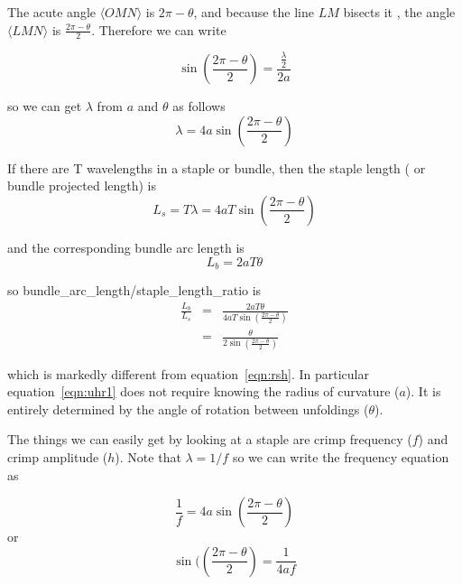 \documentclass[titlepage,10pt]{article}  %
\begin{document}


The acute angle $\langle OMN \rangle$  is $2 \pi - \theta$, and because the line $LM$ bisects it , the angle $\langle LMN \rangle$  is $\frac{2 \pi - \theta}{2}$. Therefore we can write

\begin{displaymath}
\sin\left(\frac{2 \pi - \theta}{2}\right) = \frac{\frac{\lambda}{2}}{2a}
\end{displaymath}

so we can get $\lambda$ from $a$ and $\theta$ as follows
\begin{displaymath}
\lambda = 4 a \sin\left(\frac{2 \pi - \theta}{2}\right) 
\end{displaymath}

If there are T wavelengths in a staple or bundle, then the staple length ( or bundle projected length) is 
\begin{displaymath}
L_{s} = T \lambda = 4aT \sin\left(\frac{2 \pi - \theta}{2}\right) 
\end{displaymath}

and the corresponding bundle arc length is 
\begin{displaymath}
L_{b} = 2 a T \theta
\end{displaymath}


so bundle\_arc\_length/staple\_length\_ratio  is
\begin{eqnarray}
\label{eqn:uhr1}
\frac{L_{b}}{L_{s}} & = & \frac{2 a T \theta}{4aT \sin\left(\frac{2 \pi - \theta}{2}\right)}  \nonumber \\
                    & = & \frac{\theta}{2 \sin\left(\frac{2 \pi - \theta}{2}\right)}
\end{eqnarray}

which is markedly different from equation~\ref{eqn:rsh}. In particular equation~\ref{eqn:uhr1} does not require knowing the radius of curvature ($a$). It is entirely determined by the angle of rotation between unfoldings ($\theta$). 

The things we can easily get by looking at a staple are crimp frequency ($f$) and crimp amplitude ($h$). Note that $\lambda = 1/f$ so we can write the frequency equation as 

\begin{displaymath}
 \frac{1}{f} = 4 a \sin\left(\frac{2 \pi - \theta}{2}\right)
\end{displaymath}
or
\begin{equation}
\label{eqn:f}
\sin(\left(\frac{2 \pi - \theta}{2}\right) = \frac{1}{4af}
\end{equation}
\end{document}
